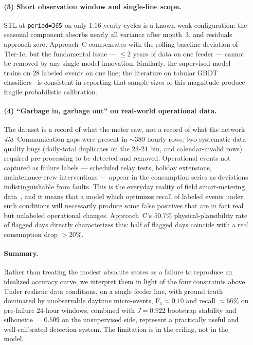 \documentclass[11pt]{article}
\begin{document}
\begin{enumerate}[leftmargin=1.5em,itemsep=1pt]
\paragraph{(3) Short observation window and single-line scope.}
STL at \texttt{period=365} on only $1.16$ yearly cycles is a known-weak configuration: the seasonal component absorbs nearly all variance after month~$3$, and residuals approach zero. Approach~C compensates with the rolling-baseline deviation of Tier-$1$c, but the fundamental issue --- $\leq 2$ years of data on one feeder --- cannot be removed by any single-model innovation. Similarly, the supervised model trains on $28$ labeled events on one line; the literature on tabular GBDT classifiers~\cite{shwartz2022tabular,chen2016xgboost} is consistent in reporting that sample sizes of this magnitude produce fragile probabilistic calibration.

\paragraph{(4) ``Garbage in, garbage out'' on real-world operational data.}
The dataset is a record of what the meter saw, not a record of what the network \emph{did}. Communication gaps were present in $\sim 380$ hourly rows; two systematic data-quality bugs (daily-total duplicates on the $23$-$24$ bin, and calendar-invalid rows) required pre-processing to be detected and removed. Operational events not captured as failure labels --- scheduled relay tests, holiday extensions, maintenance-crew interventions --- appear in the consumption series as deviations indistinguishable from faults. This is the everyday reality of field smart-metering data~\cite{himeur2021survey}, and it means that a model which optimizes recall of labeled events under such conditions will necessarily produce some false positives that are in fact real but unlabeled operational changes. Approach~C's $50.7\%$ physical-plausibility rate of flagged days directly characterizes this: half of flagged days coincide with a real consumption drop $>20\%$.

\paragraph{Summary.}
Rather than treating the modest absolute scores as a failure to reproduce an idealized accuracy curve, we interpret them in light of the four constraints above. Under realistic data conditions, on a single feeder line, with ground truth dominated by unobservable daytime micro-events, F$_1 \approx 0.10$ and recall $\approx 66\%$ on pre-failure $24$-hour windows, combined with $\overline{J}=0.922$ bootstrap stability and silhouette $=0.509$ on the unsupervised side, represent a practically useful and well-calibrated detection system. The limitation is in the ceiling, not in the model.


\end{enumerate}
\end{document}
